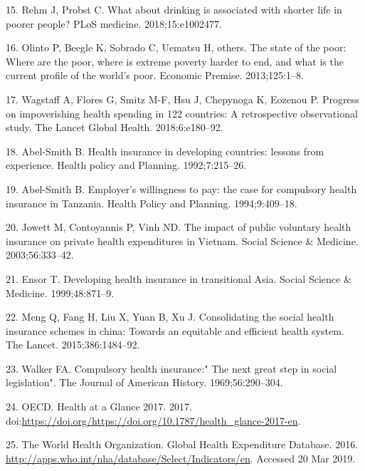 \documentclass[]{elsarticle} %
\begin{document}
\leavevmode\hypertarget{ref-rehm2018drinking}{}%
15. Rehm J, Probst C. What about drinking is associated with shorter life in poorer people? PLoS medicine. 2018;15:e1002477.

\leavevmode\hypertarget{ref-olinto2013state}{}%
16. Olinto P, Beegle K, Sobrado C, Uematsu H, others. The state of the poor: Where are the poor, where is extreme poverty harder to end, and what is the current profile of the world's poor. Economic Premise. 2013;125:1--8.

\leavevmode\hypertarget{ref-wagstaff2018progress}{}%
17. Wagstaff A, Flores G, Smitz M-F, Hsu J, Chepynoga K, Eozenou P. Progress on impoverishing health spending in 122 countries: A retrospective observational study. The Lancet Global Health. 2018;6:e180--92.

\leavevmode\hypertarget{ref-abel1992health}{}%
18. Abel-Smith B. Health insurance in developing countries: lessons from experience. Health policy and Planning. 1992;7:215--26.

\leavevmode\hypertarget{ref-abel1994employer}{}%
19. Abel-Smith B. Employer's willingness to pay: the case for compulsory health insurance in Tanzania. Health Policy and Planning. 1994;9:409--18.

\leavevmode\hypertarget{ref-jowett2003impact}{}%
20. Jowett M, Contoyannis P, Vinh ND. The impact of public voluntary health insurance on private health expenditures in Vietnam. Social Science \& Medicine. 2003;56:333--42.

\leavevmode\hypertarget{ref-ensor1999developing}{}%
21. Ensor T. Developing health insurance in transitional Asia. Social Science \& Medicine. 1999;48:871--9.

\leavevmode\hypertarget{ref-meng2015consolidating}{}%
22. Meng Q, Fang H, Liu X, Yuan B, Xu J. Consolidating the social health insurance schemes in china: Towards an equitable and efficient health system. The Lancet. 2015;386:1484--92.

\leavevmode\hypertarget{ref-walker1969compulsory}{}%
23. Walker FA. Compulsory health insurance:" The next great step in social legislation". The Journal of American History. 1969;56:290--304.

\leavevmode\hypertarget{ref-healthglance2017}{}%
24. OECD. Health at a Glance 2017. 2017. doi:\href{https://doi.org/https://doi.org/https://doi.org/10.1787/health_glance-2017-en}{https://doi.org/https://doi.org/10.1787/health\_glance-2017-en}.

\leavevmode\hypertarget{ref-WHOdata}{}%
25. The World Health Organization. Global Health Expenditure Database. 2016. \url{http://apps.who.int/nha/database/Select/Indicators/en}. Accessed 20 Mar 2019.
\end{document}
